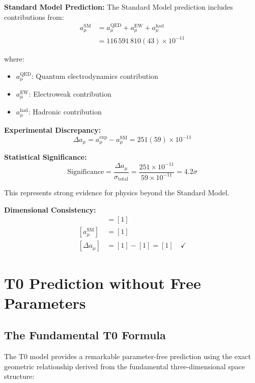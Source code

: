 \documentclass[12pt,a4paper]{report}
\begin{document}
	\textbf{Standard Model Prediction:}
	The Standard Model prediction includes contributions from:
	\begin{align}
		a_\mu^{\text{SM}} &= a_\mu^{\text{QED}} + a_\mu^{\text{EW}} + a_\mu^{\text{had}} \\
		&= 116\,591\,810(43) \times 10^{-11}
	\end{align}
	
	where:
	\begin{itemize}
		\item $a_\mu^{\text{QED}}$: Quantum electrodynamics contribution
		\item $a_\mu^{\text{EW}}$: Electroweak contribution  
		\item $a_\mu^{\text{had}}$: Hadronic contribution
	\end{itemize}
	
	\textbf{Experimental Discrepancy:}
	\begin{equation}
		\Delta a_\mu = a_\mu^{\text{exp}} - a_\mu^{\text{SM}} = 251(59) \times 10^{-11}
		\label{eq:discrepancy}
	\end{equation}
	
	\textbf{Statistical Significance:}
	\begin{equation}
		\text{Significance} = \frac{\Delta a_\mu}{\sigma_{\text{total}}} = \frac{251 \times 10^{-11}}{59 \times 10^{-11}} = 4.2\sigma
	\end{equation}
	
	This represents strong evidence for physics beyond the Standard Model.
	
	\textbf{Dimensional Consistency:}
	\begin{align}
		[a_\mu^{\text{exp}}] &= [1] \\
		[a_\mu^{\text{SM}}] &= [1] \\
		[\Delta a_\mu] &= [1] - [1] = [1] \quad \checkmark
	\end{align}
	
	\section{T0 Prediction without Free Parameters}
	\label{sec:t0_prediction}
	
	\subsection{The Fundamental T0 Formula}
	\label{subsec:t0_formula}
	
	The T0 model provides a remarkable parameter-free prediction using the exact geometric relationship derived from the fundamental three-dimensional space structure:
	
\end{document}

